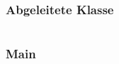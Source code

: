 \documentclass[12pt]{scrartcl}
\begin{document}
\subsubsection{Abgeleitete Klasse}
\inputminted{java}{java/src/main/java/javademo/Derivedclass.java}
\subsubsection{Main}
\inputminted{java}{java/src/main/java/javademo/Demo.java}
\pagebreak

\end{document}
